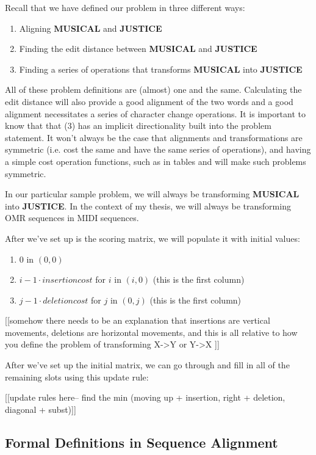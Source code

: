 Recall that we have defined our problem in three different ways:
\begin{enumerate}
\item Aligning \textbf{MUSICAL} and \textbf{JUSTICE}
\item Finding the edit distance between \textbf{MUSICAL} and \textbf{JUSTICE}
\item Finding a series of operations that transforms \textbf{MUSICAL} into \textbf{JUSTICE}
\end{enumerate}

All of these problem definitions are (almost) one and the same. Calculating the edit distance will also provide a good alignment of the two words and a good alignment necessitates a series of character change operations. It is important to know that that (3) has an implicit directionality built into the problem statement. It won't always be the case that alignments and transformations are symmetric (i.e. cost the same and have the same series of operations), and having a simple cost operation functions, such as in tables 
 and 
 will make such problems symmetric. 

In our particular sample problem, we will always be transforming \textbf{MUSICAL} into \textbf{JUSTICE}. In the context of my thesis, we will always be transforming OMR sequences in MIDI sequences. 

After we've set up is the scoring matrix, we will populate it with initial values: 
\begin{enumerate}
\item 0 in $(0,0)$
\item $i-1 \cdot insertion cost$ for $i$ in $(i, 0)$ (this is the first column) 
\item $j-1 \cdot deletion cost$ for $j$ in $(0, j)$ (this is the first column) 
\end{enumerate}
[[somehow there needs to be an explanation that insertions are vertical movements, deletions are horizontal movements, and this is all relative to how you define the problem of transforming X->Y or Y->X ]]

After we've set up the initial matrix, we can go through and fill in all of the remaining slots using this update rule:


[[update rules here-- find the min (moving up + insertion, right + deletion, diagonal + subst)]]

\subsection{Formal Definitions in Sequence Alignment}

